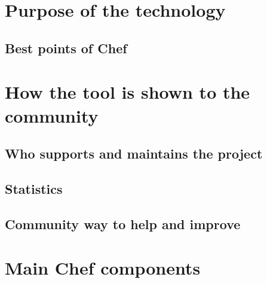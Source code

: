 \documentclass[12pt,a4paper,openright,twoside]{book}
\begin{document}
\section{Purpose of the technology}

\subsection{Best points of Chef}

\section{How the tool is shown to the community}

\subsection{Who supports and maintains the project}

\subsection{Statistics}

\subsection{Community way to help and improve}

\section{Main Chef components}



\end{document}
